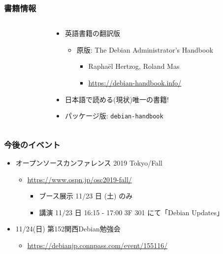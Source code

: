 \documentclass[cjk,c,squeeze,shrink,dvipdfmx,12pt]{beamer}
\begin{document}
\begin{frame}
  \frametitle{書籍情報}
  \begin{columns}
    \begin{column}{.45\paperwidth}
      \centering
    \end{column}
    \begin{column}{.54\paperwidth}
      \begin{itemize}
      \item %
        英語書籍の翻訳版
        \begin{itemize}
        \item %
          原版: The Debian Administrator's Handbook
          \begin{itemize}
          \item %
            Rapha\"el Hertzog, Roland Mas
          \item \url{https://debian-handbook.info/}
          \end{itemize}
        \end{itemize}
      \item %
        日本語で読める(現状)唯一の書籍!
      \item %
        パッケージ版:
        \texttt{debian-handbook}
      \end{itemize}
    \end{column}
  \end{columns}
\end{frame}


\begin{frame}
  \frametitle{今後のイベント}
  \begin{itemize}
  \item オープンソースカンファレンス 2019 Tokyo/Fall
    \begin{itemize}
    \item \url{https://www.ospn.jp/osc2019-fall/}
      \begin{itemize}
	\item ブース展示 11/23 日 (土) のみ
        \item 講演 11/23 日 16:15 - 17:00 3F 301 にて「Debian Updates」
      \end{itemize}
    \end{itemize}
  \item 11/24(日) 第152関西Debian勉強会
    \begin{itemize}
    \item \url{https://debianjp.connpass.com/event/155116/}
    \end{itemize}
  \end{itemize}
\end{frame}



\end{document}
